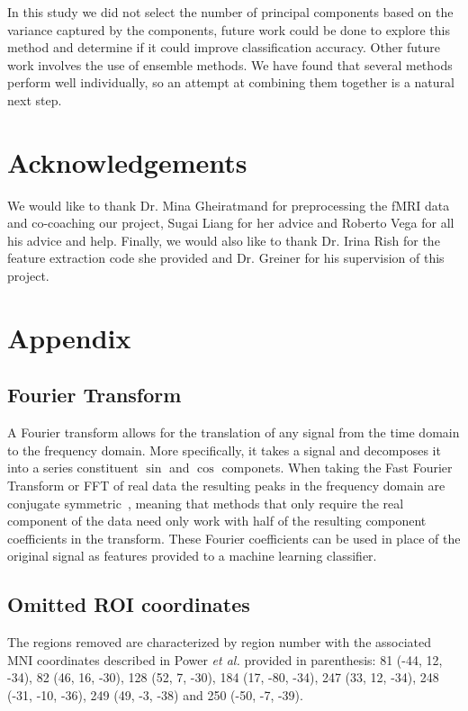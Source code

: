 \documentclass{article} %
\begin{document}
In this study we did not select the number of principal components based 
on the variance captured by the components, future work could be done
to explore this method and determine if it could improve classification
accuracy. Other future work involves the use of ensemble methods. We have
found that several methods perform well individually, so an attempt at
combining them together is a natural next step.

\section{Acknowledgements}
We would like to thank Dr. Mina Gheiratmand for preprocessing the fMRI data 
and co-coaching our project, Sugai Liang for her advice and Roberto Vega for
all his advice and help. Finally, we would also like to thank Dr. Irina Rish
for the feature extraction code she provided and Dr. Greiner for his
supervision of this project.




\section{Appendix}

\subsection{Fourier Transform}
A Fourier transform allows for the translation of any signal from the time
domain to the frequency domain. More specifically, it takes a signal and
decomposes it into a series constituent $\sin$ and $\cos$ componets. When 
taking the Fast Fourier Transform or FFT of real data the resulting peaks in 
the frequency domain are conjugate symmetric~\cite{duhamel1990fast}, meaning 
that methods that only require the real component of the data need only work 
with half of the resulting component coefficients in the transform. These 
Fourier coefficients can be used in place of the original signal as features
provided to a machine learning classifier.

\subsection{Omitted ROI coordinates}
The regions removed
are characterized by region number with the associated MNI coordinates 
described in Power \emph{et al.} provided in parenthesis: 81 (-44, 12, -34), 
82 (46, 16, -30), 128 (52, 7, -30), 184 (17, -80, -34), 247 (33, 12, -34), 
248 (-31, -10, -36), 249 (49, -3, -38) and 250 (-50, -7, -39).
\end{document}
